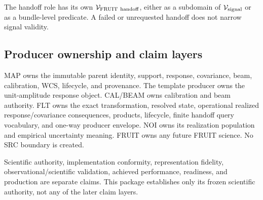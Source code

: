The handoff role has its own $\mathcal{V}_{\rm FRUIT\ handoff}$, either as a
subdomain of $\mathcal{V}_{\rm signal}$ or as a bundle-level predicate. A failed or
unrequested handoff does not narrow signal validity.

\subsection{Producer ownership and claim layers}

MAP owns the immutable parent identity, support, response, covariance, beam,
calibration, WCS, lifecycle, and provenance. The template producer owns the
unit-amplitude response object. CAL/BEAM owns calibration and beam authority.
FLT owns the exact transformation, resolved state, operational realized
response/covariance consequences, products, lifecycle, finite handoff query
vocabulary, and one-way producer envelope. NOI owns its
realization population and empirical uncertainty meaning. FRUIT owns any
future FRUIT science. No SRC boundary is created.

Scientific authority, implementation conformity, representation fidelity,
observational/scientific validation, achieved performance, readiness, and
production are separate claims. This package establishes only its frozen
scientific authority, not any of the later claim layers.
